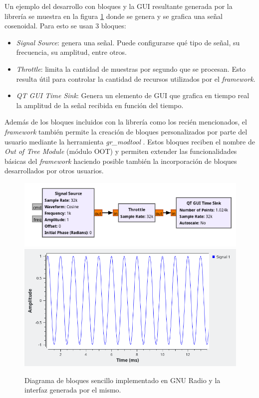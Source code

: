 \documentclass[../../main.tex]{subfiles}
\begin{document}
Un ejemplo del desarrollo con bloques y la GUI resultante generada por la librería se muestra en la figura \ref{fig::gnu-dummy} donde se genera  y se grafica una señal cosenoidal. Para esto se usan 3 bloques: 
\begin{itemize}
    \item \textit{Signal Source}: genera una señal. Puede configurarse qué tipo de señal, su frecuencia, su amplitud, entre otros.
    \item \textit{Throttle}: limita la cantidad de muestras por segundo que se procesan. Esto resulta útil para controlar la cantidad de recursos utilizados por el \textit{framework}.
    \item \textit{QT GUI Time Sink}: Genera un elemento de GUI que grafica en tiempo real la amplitud de la señal recibida en función del tiempo.
\end{itemize}

Además de los bloques incluidos con la librería como los recién mencionados, el \textit{framework} también permite la creación de bloques personalizados por parte del usuario mediante la herramienta \textit{gr\_modtool} \cite{gr-modtool}. Estos bloques reciben el nombre de \textit{Out of Tree Module} (módulo OOT) y permiten extender las funcionalidades básicas del \textit{framework} haciendo posible también la incorporación de bloques desarrollados por otros usuarios.

\begin{figure}[H]
    \centering
    {\includegraphics[width=0.5\linewidth]{gnu-dummy-bd.png}}\\[1PC]
    {\includegraphics[width=0.5\linewidth]{gnu-dummy-plot.png}}
    \caption{Diagrama de bloques sencillo implementado en GNU Radio y la interfaz generada por el mismo.}
    \label{fig::gnu-dummy}
\end{figure}
\end{document}
